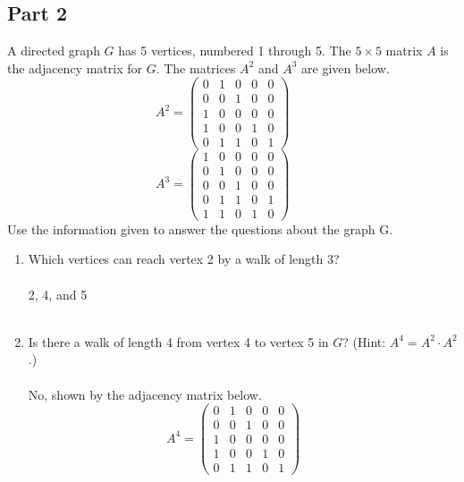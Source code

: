 \documentclass{amsart}
\theoremstyle{definition}
\theoremstyle{Exercise}
\theoremstyle{remark}
\theoremstyle{rule}
\numberwithin{equation}{section}
\begin{document}
\subsection*{Part 2}
A directed graph $G$ has 5 vertices, numbered 1 through 5. The $5\times 5$ matrix $A$ is the adjacency matrix for $G$. The matrices $A^2$ and $A^3$ are given below.
\[
A^2  = \left( \begin{array}{ccccc}
0 & 1 & 0 & 0 & 0 \\
0 & 0 & 1 & 0 & 0\\
1 & 0 & 0 & 0 & 0\\
1 & 0 & 0 & 1 & 0\\
0 & 1 & 1 & 0 & 1
\end{array} \right)~~~~~~~
\]
\[
A^3  = \left( \begin{array}{ccccc}
1 & 0 & 0 & 0 & 0 \\
0 & 1 & 0 & 0 & 0\\
0 & 0 & 1 & 0 & 0\\
0 & 1 & 1 & 0 & 1\\
1 & 1 & 0 & 1 & 0
\end{array} \right)~~~~~~~
\]
Use the information given to answer the questions about the graph G.
\begin{enumerate}[label=(\alph*)]
\item Which vertices can reach vertex 2 by a walk of length 3?\\\\
2, 4, and 5
\\\\

\item Is there a walk of length 4 from vertex 4 to vertex 5 in $G$? (Hint: $A^4 = A^2\cdot A^2$.)\\\\
No, shown by the adjacency matrix below.
\[
A^4  = \left( \begin{array}{ccccc}
0 & 1 & 0 & 0 & 0 \\
0 & 0 & 1 & 0 & 0\\
1 & 0 & 0 & 0 & 0\\
1 & 0 & 0 & 1 & 0\\
0 & 1 & 1 & 0 & 1
\end{array} \right)~~~~~~~
\]
\end{enumerate}

 \newpage
\end{document}
